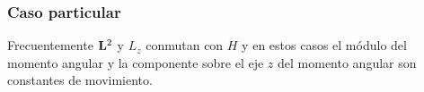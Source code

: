 \documentclass[12pt]{beamer}
\begin{document}
\begin{frame}
\frametitle{Caso particular}
Frecuentemente $\vb{L}^{2}$ y $L_{z}$ conmutan con $H$ \pause y en estos casos el módulo del momento angular y la componente sobre el eje $z$ del momento angular son constantes de movimiento.
\end{frame}


\end{document}
